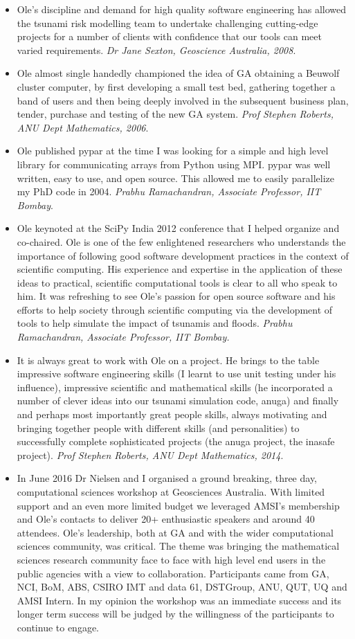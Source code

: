 \documentclass[11pt,a4paper]{article}
\begin{document}
\begin{itemize}
  \item Ole’s discipline and demand for high quality software engineering has allowed the tsunami risk modelling team to undertake challenging cutting-edge projects for a number of clients with confidence that our tools can meet varied requirements. \emph{Dr Jane Sexton, Geoscience Australia, 2008}.
  \item Ole almost single handedly championed the idea of GA obtaining a Beuwolf cluster computer, by first developing a small test bed, gathering together a band of users and then being deeply involved in the subsequent business plan, tender, purchase and testing of the new GA system. \emph{Prof Stephen Roberts, ANU Dept Mathematics, 2006}.
  \item Ole published pypar at the time I was looking for a simple and high level library for communicating arrays from Python using MPI.  pypar was well written, easy to use, and open source.  This allowed me to easily parallelize my PhD code in 2004.
    \emph{Prabhu Ramachandran, Associate Professor, IIT Bombay}.
  \item Ole keynoted at the SciPy India 2012 conference that I helped organize and co-chaired.  Ole is one of the few enlightened researchers who understands the importance of following good software development practices in the context of scientific computing.  His experience and expertise in the application of these ideas to practical, scientific computational tools is clear to all who speak to him.  It was refreshing to see Ole's passion for open source software and his efforts to help society through scientific computing via the development of tools to help simulate the impact of tsunamis and floods.
    \emph{Prabhu Ramachandran, Associate Professor, IIT Bombay.} 
  \item It is always great to work with Ole on a project. He brings to the table impressive software engineering skills (I learnt to use unit testing under his influence), impressive scientific and mathematical skills (he incorporated a number of clever ideas into our tsunami simulation code, anuga) and finally and perhaps most importantly great people skills, always motivating and bringing together people with different skills (and personalities) to successfully complete sophisticated projects (the anuga project, the inasafe project).
    \emph{Prof Stephen Roberts, ANU Dept Mathematics, 2014}.
\item In June 2016 Dr Nielsen and I organised a ground breaking, three day, computational sciences workshop at Geosciences Australia. With limited support and an even more limited budget we leveraged AMSI’s membership and Ole’s contacts to deliver 20+ enthusiastic speakers and around 40 attendees. Ole’s leadership, both at GA and with the wider computational sciences community, was critical. The theme was bringing the mathematical sciences research community face to face with high level end users in the public agencies with a view to collaboration. Participants came from GA, NCI, BoM, ABS, CSIRO IMT and data 61, DSTGroup, ANU, QUT, UQ and AMSI Intern. In my opinion the workshop was an immediate success and its longer term success will be judged by the willingness of the participants to continue to engage.

\end{itemize}
\end{document}
